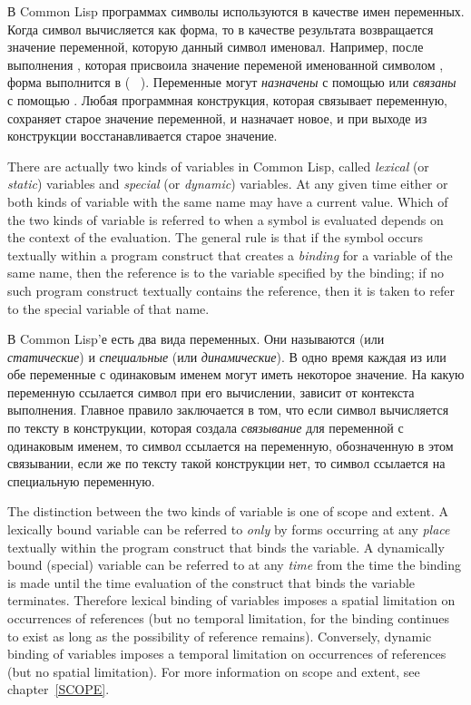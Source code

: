 В Common Lisp программах символы используются в качестве имен переменных.
Когда символ вычисляется как форма, то в качестве результата возвращается
значение переменной, которую данный символ именовал. Например, после выполнения
, которая присвоила значение  переменой именованной
символом , форма  выполнится в  ( \EV\
).
Переменные могут \textit{назначены} с помощью  или \textit{связаны} с
помощью \cdf{let}.
Любая программная конструкция, которая связывает переменную, сохраняет старое
значение переменной, и назначает новое, и при выходе из конструкции
восстанавливается старое значение.

There are actually two kinds of variables in Common Lisp, called \textit{lexical} (or
\textit{static}) variables and \textit{special} (or \textit{dynamic}) variables.
At any given time either or both kinds of variable with the same name may
have a current value.  Which of the two kinds of variable is referred to
when a symbol is evaluated depends on the context of the evaluation.
The general rule is that if the symbol occurs textually within a program
construct that creates a \textit{binding} for a variable of the same name,
then the reference is to the variable specified by the binding;
if no such program construct textually contains the reference, then
it is taken to refer to the special variable of that name.

В Common Lisp'е есть два вида переменных. Они называются  (или
\textit{статические}) и \textit{специальные} (или \textit{динамические}).
В одно время каждая из или обе переменные с одинаковым именем могут иметь
некоторое значение. На какую переменную ссылается символ при его вычислении,
зависит от контекста выполнения. Главное правило заключается в том, что если
символ вычисляется по тексту в конструкции, которая создала \textit{связывание} для
переменной с одинаковым именем, то символ ссылается на переменную, обозначенную
в этом связывании, если же по тексту такой конструкции нет, то символ ссылается
на специальную переменную.

The distinction between the two kinds of variable is one of scope
and extent.  A lexically bound variable can be referred to \textit{only}
by forms occurring at any \textit{place} textually within the program construct that
binds the variable.  A dynamically bound (special) variable can
be referred to at any \textit{time} from the time the binding is made
until the time evaluation of the construct that binds the variable
terminates.  Therefore lexical binding of variables
imposes a spatial limitation
on occurrences of references (but no temporal limitation, for the
binding continues to exist as long as the possibility of reference
remains).  Conversely, dynamic binding of variables imposes a temporal
limitation on occurrences of references (but no spatial limitation).
For more information on scope and extent, see chapter~\ref{SCOPE}.

